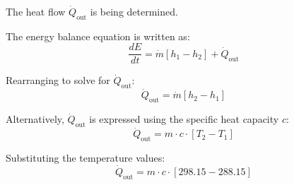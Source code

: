 The heat flow \( \dot{Q}_{\text{out}} \) is being determined.  

The energy balance equation is written as:  
\[
\frac{dE}{dt} = \dot{m} \left[ h_1 - h_2 \right] + \dot{Q}_{\text{out}}
\]  

Rearranging to solve for \( \dot{Q}_{\text{out}} \):  
\[
\dot{Q}_{\text{out}} = \dot{m} \left[ h_2 - h_1 \right]
\]  

Alternatively, \( \dot{Q}_{\text{out}} \) is expressed using the specific heat capacity \( c \):  
\[
\dot{Q}_{\text{out}} = m \cdot c \cdot \left[ T_2 - T_1 \right]
\]  

Substituting the temperature values:  
\[
\dot{Q}_{\text{out}} = m \cdot c \cdot \left[ 298.15 - 288.15 \right]
\]